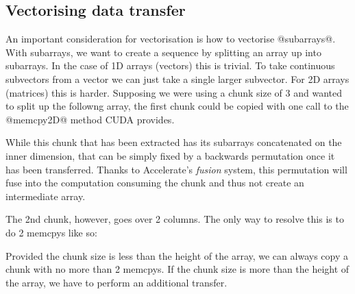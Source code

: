 


\subsection {Vectorising data transfer}

An important consideration for vectorisation is how to vectorise @subarrays@. With subarrays, we want to create a sequence by splitting an array up into subarrays. In the case of 1D arrays (vectors) this is trivial. To take continuous subvectors from a vector we can just take a single larger subvector. For 2D arrays (matrices) this is harder. Supposing we were using a chunk size of 3 and wanted to split up the followng array, the first chunk could be copied with one call to the @memcpy2D@ method CUDA provides.


While this chunk that has been extracted has its subarrays concatenated on the inner dimension, that can be simply fixed by a backwards permutation once it has been transferred. Thanks to Accelerate's \emph{fusion} system, this permutation will fuse into the computation consuming the chunk and thus not create an intermediate array.

The 2nd chunk, however, goes over 2 columns. The only way to resolve this is to do 2 memcpys like so:


Provided the chunk size is less than the height of the array, we can always copy a chunk with no more than 2 memcpys. If the chunk size is more than the height of the array, we have to perform an additional transfer.


